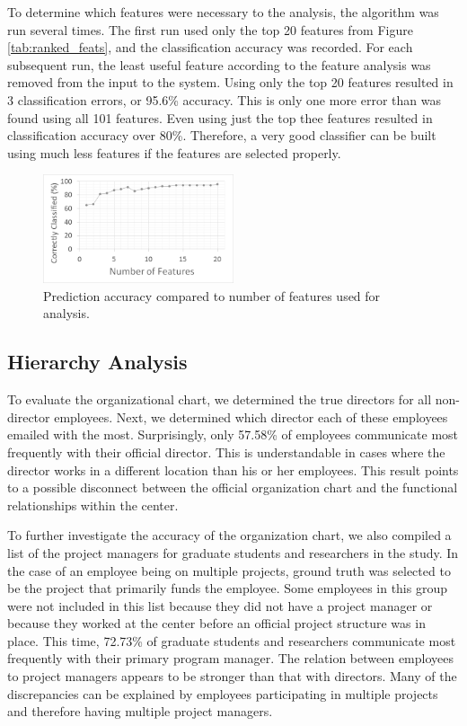 \documentclass{article}
\begin{document}
To determine which features were necessary to the analysis, the algorithm was run several times.  The first run used only the top 20 features from Figure \ref{tab:ranked_feats}, and the classification accuracy was recorded.  For each subsequent run, the least useful feature according to the feature analysis was removed from the input to the system.  Using only the top 20 features resulted in 3 classification errors, or 95.6\% accuracy.  This is only one more error than was found using all 101 features.  Even using just the top thee features resulted in classification accuracy over 80\%.  Therefore, a very good classifier can be built using much less features if the features are selected properly.
\begin{figure}[H]
    \centering
        \includegraphics[width=0.5\textwidth]{FeatureAnalysis}
        \caption{Prediction accuracy compared to number of features used for analysis.}
        \label{fig:feat_analysis}
\end{figure}

\subsection{Hierarchy Analysis}
To evaluate the organizational chart, we determined the true directors for all non-director employees.  Next, we determined which director each of these employees emailed with the most.  Surprisingly, only 57.58\% of employees communicate most frequently with their official director.  This is understandable in cases where the director works in a different location than his or her employees.  This result points to a possible disconnect between the official organization chart and the functional  relationships within the center.
\par
To further investigate the accuracy of the organization chart, we also compiled a list of the project managers for graduate students and researchers in the study.  In the case of an employee being on multiple projects, ground truth was selected to be the project that primarily funds the employee.  Some employees in this group were not included in this list because they did not have a project manager or because they worked at the center before an official project structure was in place.  This time, 72.73\% of graduate students and researchers communicate most frequently with their primary program manager.  The relation between employees to project managers appears to be stronger than that with directors.  Many of the discrepancies can be explained by employees participating in multiple projects and therefore having multiple project managers.
\end{document}
